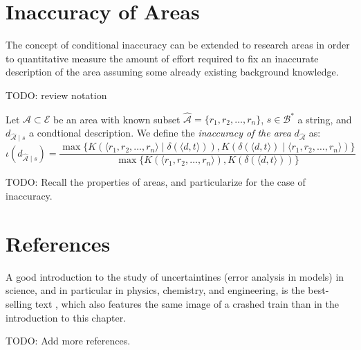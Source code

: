 %
%

\section{Inaccuracy of Areas}

The concept of conditional inaccuracy can be extended to research areas in order to quantitative measure the amount of effort required to fix an inaccurate description of the area assuming some already existing background knowledge.

{\color{red} TODO: review notation}

\begin{definition}
Let $\mathcal{A} \subset \mathcal{E}$ be an area with known subset $\hat{\mathcal{A}} = \{r_1, r_2, \ldots, r_n\}$, $s \in \mathcal{B}^\ast$ a string, and $d_{\hat{\mathcal{A}} \mid s}$ a condtional description. We define the \emph{inaccuracy of the area} $d_{\hat{\mathcal{A}}}$ as:
\[
\iota(d_{\hat{\mathcal{A}} \mid s}) = \frac{ \max\{ K \left( \langle r_1, r_2, \ldots, r_n \rangle \mid \delta(\langle d, t \rangle) \right), K \left( \delta(\langle d, t \rangle) \mid \langle r_1, r_2, \ldots, r_n \rangle \right) \} } { \max\{ K(\langle r_1, r_2, \ldots, r_n \rangle), K \left(\delta(\langle d, t \rangle) \right) \} }
\]
\end{definition}

{\color{red} TODO: Recall the properties of areas, and particularize for the case of inaccuracy.}

%
%

\section*{References}

A good introduction to the study of uncertaintines (error analysis in models) in science, and in particular in physics, chemistry, and engineering, is the best-selling text \cite{taylor2022introduction}, which also features the same image of a crashed train than in the introduction to this chapter.

{\color{red} TODO: Add more references.}

